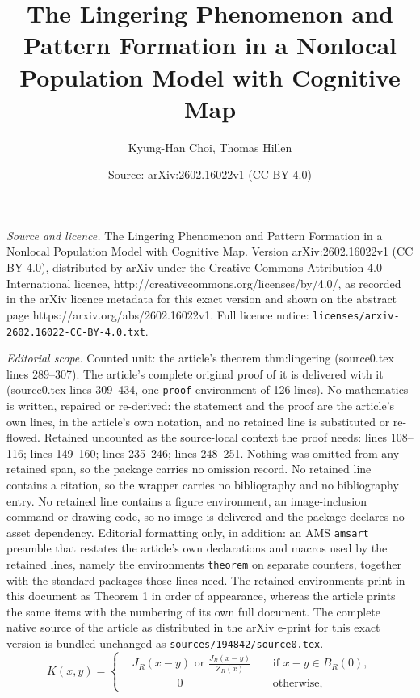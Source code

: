 \documentclass[10pt,a4paper]{amsart}
\title{The Lingering Phenomenon and Pattern Formation in a Nonlocal Population Model with Cognitive Map}
\author{Kyung-Han Choi, Thomas Hillen}
\date{Source: arXiv:2602.16022v1 (CC BY 4.0)}
\begin{document}
\maketitle

\noindent\emph{Source and licence.} The Lingering Phenomenon and Pattern Formation in a Nonlocal Population Model with Cognitive Map. Version arXiv:2602.16022v1 (CC BY 4.0), distributed by arXiv under the Creative Commons Attribution 4.0 International licence, http://creativecommons.org/licenses/by/4.0/, as recorded in the arXiv licence metadata for this exact version and shown on the abstract page https://arxiv.org/abs/2602.16022v1. Full licence notice: \texttt{licenses/arxiv-2602.16022-CC-BY-4.0.txt}.\par\smallskip

\noindent\textit{Editorial scope.} Counted unit: the article's theorem thm:lingering (source0.tex lines 289--307). The article's complete original proof of it is delivered with it (source0.tex lines 309--434, one \texttt{proof} environment of 126 lines). No mathematics is written, repaired or re-derived: the statement and the proof are the article's own lines, in the article's own notation, and no retained line is substituted or re-flowed.  Retained uncounted as the source-local context the proof needs: lines 108--116; lines 149--160; lines 235--246; lines 248--251.  Nothing was omitted from any retained span, so the package carries no omission record.  No retained line contains a citation, so the wrapper carries no bibliography and no bibliography entry.  No retained line contains a figure environment, an image-inclusion command or drawing code, so no image is delivered and the package declares no asset dependency.  Editorial formatting only, in addition: an AMS \texttt{amsart} preamble that restates the article's own declarations and macros used by the retained lines, namely the environments \texttt{theorem} on separate counters, together with the standard packages those lines need.  The retained environments print in this document as Theorem 1 in order of appearance, whereas the article prints the same items with the numbering of its own full document.  The complete native source of the article as distributed in the arXiv e-print for this exact version is bundled unchanged as \texttt{sources/194842/source0.tex}.
\begin{equation}\label{defkernel}K(x,y) = \left\{\begin{aligned}
    &J_R(x-y) \text{ or }\frac{J_R(x-y)}{Z_R(x)} &&\text{ if } x-y\in B_R(0),\\
    &\qquad\qquad 0&& \text{ otherwise, }
\end{aligned}\right. 
\end{equation}
\end{document}
